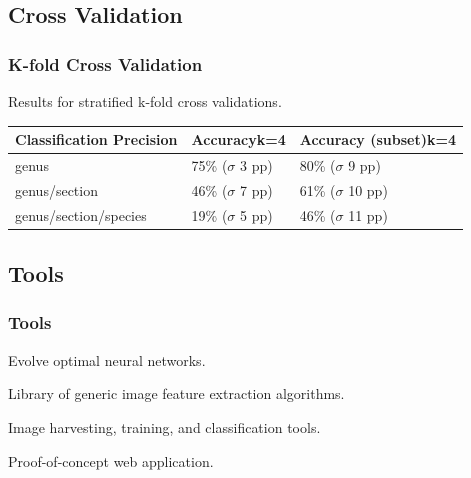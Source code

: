 \documentclass[]{beamer}
\begin{document}
    \subsection{Cross Validation}

    \begin{frame}
        \frametitle{K-fold Cross Validation}

        Results for stratified k-fold cross validations.

        \begin{table}[h]\scriptsize
            \begin{center}
            \begin{tabular}{lp{3cm}p{3cm}}
            \toprule
            \textbf{Classification Precision} & \textbf{Accuracy{\newline}k=4} & \textbf{Accuracy (subset){\newline}k=4} \\
            \midrule
            genus                   & 75\% ({$\sigma$} 3 pp)    & 80\% ({$\sigma$} 9 pp) \\
            genus/section           & 46\% ({$\sigma$} 7 pp)    & 61\% ({$\sigma$} 10 pp) \\
            genus/section/species   & 19\% ({$\sigma$} 5 pp)    & 46\% ({$\sigma$} 11 pp) \\
            \bottomrule
            \end{tabular}
            \end{center}
        \end{table}
    \end{frame}

    \subsection{Tools}

    \begin{frame}
        \frametitle{Tools}

        \begin{description}
            \item[\texttt{AIvolver}] Evolve optimal neural networks.
            \item[\texttt{ImgPheno}] Library of generic image feature extraction algorithms.
            \item[\texttt{NBClassify}] Image harvesting, training, and classification tools.
            \item[\texttt{OrchiD}] Proof-of-concept web application.
        \end{description}

    \end{frame}
\end{document}
